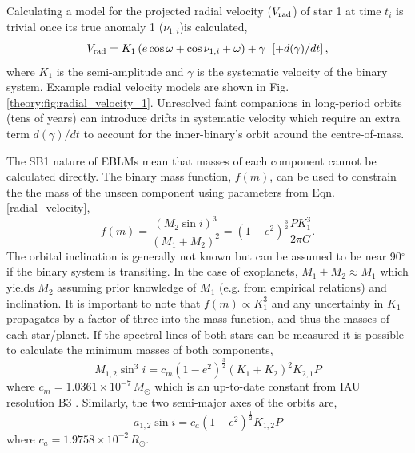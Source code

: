 Calculating a model for the projected radial velocity ($V_{\rm rad}$) of star 1 at time $t_i$ is trivial once its true anomaly 1 ($\nu_{1,i}$)is calculated,
%
\begin{equation}\label{radial_velocity}
V_{\rm rad} = K_1 \left( e \cos \omega + \cos \nu_{1,i} + \omega \right) + \gamma\:\: \left[+ d(\gamma) / dt\right],
\end{equation}
%
where $K_1$ is the semi-amplitude and $\gamma$ is the systematic velocity of the binary system. Example radial velocity models are shown in Fig. \ref{theory:fig:radial_velocity_1}.  Unresolved faint companions in long-period orbits (tens of years) can introduce drifts in systematic velocity which require an extra term $d(\gamma) / dt$ to account for the inner-binary's orbit around the centre-of-mass. 

The SB1 nature of EBLMs mean that masses of each component cannot be calculated directly. The binary mass function, $f(m)$, can be used to constrain the the mass of the unseen component using parameters from Eqn. \ref{radial_velocity},
%
\begin{equation}\label{mass_function}
f(m)  =  \frac{(M_2 \sin i)^3}{(M_1 + M_2)^2} =  (1-e^2)^{\frac{3}{2}} \frac{P K_1^3}{2 \pi G}.
\end{equation}
%
The orbital inclination is generally not known but can be assumed to be near 90$^\circ$ if the binary system is transiting. In the case of exoplanets, $M_1 + M_2 \approx M_1$ which yields $M_2$ assuming prior knowledge of $M_1$ (e.g. from empirical relations) and inclination. It is important to note that $f(m) \propto K_1^3$ and any uncertainty in $K_1$ propagates by a factor of three into the mass function, and thus the masses of each star/planet. If the spectral lines of both stars can be measured it is possible to calculate the minimum masses of both components,
%
\begin{equation}
M_{1,2} \sin^3 i = c _m(1 - e^2)^{\frac{3}{2}} (K_1 + K_2)^2 K_{2,1} P
\end{equation}
%
where $c_m=1.0361 \times 10^{-7}\,M_\odot$ which is an up-to-date constant from IAU resolution B3 \citep{2016AJ....152...41P}. Similarly, the two semi-major axes of the orbits are,
%
\begin{equation}\label{theory:a}
a_{1,2} \sin i = c_a (1 - e^2)^{\frac{1}{2}}K_{1,2} P
\end{equation}
%
where $c_a = 1.9758 \times 10^{-2}\,R_\odot$.





